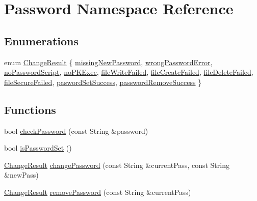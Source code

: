 \hypertarget{namespacePassword}{}\section{Password Namespace Reference}
\label{namespacePassword}
\subsection*{Enumerations}
\begin{DoxyCompactItemize}
\item 
enum \mbox{\hyperlink{namespacePassword_a24f6e5d7a04a280a0ffe45daa70f0bf3}{Change\+Result}} \{ \newline
\mbox{\hyperlink{namespacePassword_a24f6e5d7a04a280a0ffe45daa70f0bf3a1cc022c26be9b6668e6a7e2becbbba81}{missing\+New\+Password}}, 
\mbox{\hyperlink{namespacePassword_a24f6e5d7a04a280a0ffe45daa70f0bf3ac117981a097e8dafa706eccad3a0c26e}{wrong\+Password\+Error}}, 
\mbox{\hyperlink{namespacePassword_a24f6e5d7a04a280a0ffe45daa70f0bf3a483873270111450ca8e9d75e9f7c07af}{no\+Password\+Script}}, 
\mbox{\hyperlink{namespacePassword_a24f6e5d7a04a280a0ffe45daa70f0bf3a0e68e0eb319c0678eaf145d9982a9df1}{no\+P\+K\+Exec}}, 
\newline
\mbox{\hyperlink{namespacePassword_a24f6e5d7a04a280a0ffe45daa70f0bf3a58513f7575aa414bbfa3c6fcc66765fa}{file\+Write\+Failed}}, 
\mbox{\hyperlink{namespacePassword_a24f6e5d7a04a280a0ffe45daa70f0bf3a23b6e6c40fdad90c9a3ed7cd63be46a4}{file\+Create\+Failed}}, 
\mbox{\hyperlink{namespacePassword_a24f6e5d7a04a280a0ffe45daa70f0bf3a580967094c01e46e027e8afb3e32bd6d}{file\+Delete\+Failed}}, 
\mbox{\hyperlink{namespacePassword_a24f6e5d7a04a280a0ffe45daa70f0bf3ad55eaf4617a386e255ad4ec4eb1a809f}{file\+Secure\+Failed}}, 
\newline
\mbox{\hyperlink{namespacePassword_a24f6e5d7a04a280a0ffe45daa70f0bf3a7a7519d58e404a90dbd8be837812f14b}{pasword\+Set\+Success}}, 
\mbox{\hyperlink{namespacePassword_a24f6e5d7a04a280a0ffe45daa70f0bf3aabf81c97b069faf5e5b906d33e0b1b6e}{password\+Remove\+Success}}
 \}
\end{DoxyCompactItemize}
\subsection*{Functions}
\begin{DoxyCompactItemize}
\item 
bool \mbox{\hyperlink{namespacePassword_a2af5e07ad6fd20b5cce68816918841e0}{check\+Password}} (const String \&password)
\item 
bool \mbox{\hyperlink{namespacePassword_af0fd405869c0992e97c8337fde640ebc}{is\+Password\+Set}} ()
\item 
\mbox{\hyperlink{namespacePassword_a24f6e5d7a04a280a0ffe45daa70f0bf3}{Change\+Result}} \mbox{\hyperlink{namespacePassword_aeca8cfb7c7b403e605deade48483acc8}{change\+Password}} (const String \&current\+Pass, const String \&new\+Pass)
\item 
\mbox{\hyperlink{namespacePassword_a24f6e5d7a04a280a0ffe45daa70f0bf3}{Change\+Result}} \mbox{\hyperlink{namespacePassword_ae4e4ad4b5cce5367fb71481aef24c13d}{remove\+Password}} (const String \&current\+Pass)
\end{DoxyCompactItemize}


